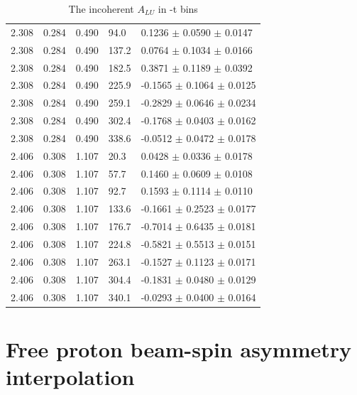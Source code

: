 \begin{table}[!h]
\begin{center}
\begin{tabular}{||l|l|l|l|l||}
  2.308 & 0.284 & 0.490  & 94.0  &  0.1236 $\pm$ 0.0590 $\pm$ 0.0147 \\
  2.308 & 0.284 & 0.490  & 137.2 &  0.0764 $\pm$ 0.1034 $\pm$ 0.0166 \\
  2.308 & 0.284 & 0.490  & 182.5 &  0.3871 $\pm$ 0.1189 $\pm$ 0.0392 \\
  2.308 & 0.284 & 0.490  & 225.9 & -0.1565 $\pm$ 0.1064 $\pm$ 0.0125 \\
  2.308 & 0.284 & 0.490  & 259.1 & -0.2829 $\pm$ 0.0646 $\pm$ 0.0234 \\
  2.308 & 0.284 & 0.490  & 302.4 & -0.1768 $\pm$ 0.0403 $\pm$ 0.0162 \\
  2.308 & 0.284 & 0.490  & 338.6 & -0.0512 $\pm$ 0.0472 $\pm$ 0.0178 \\
 \hline                                    
   2.406 & 0.308 & 1.107 & 20.3  &  0.0428 $\pm$ 0.0336 $\pm$ 0.0178 \\
   2.406 & 0.308 & 1.107 & 57.7  &  0.1460 $\pm$ 0.0609 $\pm$ 0.0108 \\
   2.406 & 0.308 & 1.107 & 92.7  &  0.1593 $\pm$ 0.1114 $\pm$ 0.0110 \\
   2.406 & 0.308 & 1.107 & 133.6 & -0.1661 $\pm$ 0.2523 $\pm$ 0.0177 \\
   2.406 & 0.308 & 1.107 & 176.7 & -0.7014 $\pm$ 0.6435 $\pm$ 0.0181 \\
   2.406 & 0.308 & 1.107 & 224.8 & -0.5821 $\pm$ 0.5513 $\pm$ 0.0151 \\
   2.406 & 0.308 & 1.107 & 263.1 & -0.1527 $\pm$ 0.1123 $\pm$ 0.0171 \\
   2.406 & 0.308 & 1.107 & 304.4 & -0.1831 $\pm$ 0.0480 $\pm$ 0.0129 \\
   2.406 & 0.308 & 1.107 & 340.1 & -0.0293 $\pm$ 0.0400 $\pm$ 0.0164 \\

 \hline
 \hline
 \end{tabular}
 \caption{The incoherent $A_{LU}$ in -t bins}
 \label{table:InCoh_t_BSA}
 \end{center}
\end{table}

\chapter{Free proton beam-spin asymmetry interpolation} 
\label{app:free-proton-alu}
